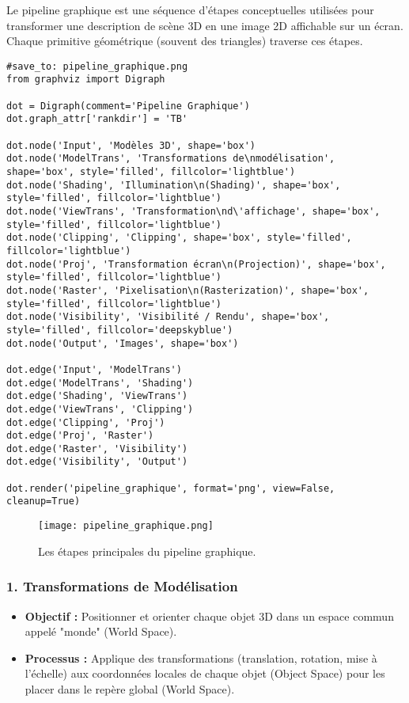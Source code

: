 \documentclass{article}
\begin{document}
Le pipeline graphique est une séquence d'étapes conceptuelles utilisées pour transformer une description de scène 3D en une image 2D affichable sur un écran. Chaque primitive géométrique (souvent des triangles) traverse ces étapes.

\begin{verbatim}
#save_to: pipeline_graphique.png
from graphviz import Digraph

dot = Digraph(comment='Pipeline Graphique')
dot.graph_attr['rankdir'] = 'TB'

dot.node('Input', 'Modèles 3D', shape='box')
dot.node('ModelTrans', 'Transformations de\nmodélisation', shape='box', style='filled', fillcolor='lightblue')
dot.node('Shading', 'Illumination\n(Shading)', shape='box', style='filled', fillcolor='lightblue')
dot.node('ViewTrans', 'Transformation\nd\'affichage', shape='box', style='filled', fillcolor='lightblue')
dot.node('Clipping', 'Clipping', shape='box', style='filled', fillcolor='lightblue')
dot.node('Proj', 'Transformation écran\n(Projection)', shape='box', style='filled', fillcolor='lightblue')
dot.node('Raster', 'Pixelisation\n(Rasterization)', shape='box', style='filled', fillcolor='lightblue')
dot.node('Visibility', 'Visibilité / Rendu', shape='box', style='filled', fillcolor='deepskyblue')
dot.node('Output', 'Images', shape='box')

dot.edge('Input', 'ModelTrans')
dot.edge('ModelTrans', 'Shading')
dot.edge('Shading', 'ViewTrans')
dot.edge('ViewTrans', 'Clipping')
dot.edge('Clipping', 'Proj')
dot.edge('Proj', 'Raster')
dot.edge('Raster', 'Visibility')
dot.edge('Visibility', 'Output')

dot.render('pipeline_graphique', format='png', view=False, cleanup=True)
\end{verbatim}

\begin{figure}[H]
\centering
\texttt{[image: pipeline\_graphique.png]}
\caption{Les étapes principales du pipeline graphique.}
\label{fig:pipeline_graphique}
\end{figure}

\subsubsection{1. Transformations de Modélisation}
\begin{itemize}
    \item \textbf{Objectif :} Positionner et orienter chaque objet 3D dans un espace commun appelé "monde" (World Space).
    \item \textbf{Processus :} Applique des transformations (translation, rotation, mise à l'échelle) aux coordonnées locales de chaque objet (Object Space) pour les placer dans le repère global (World Space).
\end{itemize}
\end{document}
